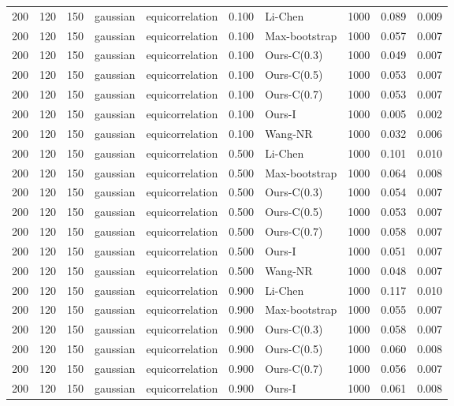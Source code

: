 \begin{tabular}{rrrllrlrrr}
200 & 120 & 150 & gaussian & equicorrelation & 0.100 & Li-Chen & 1000 & 0.089 & 0.009 \\
200 & 120 & 150 & gaussian & equicorrelation & 0.100 & Max-bootstrap & 1000 & 0.057 & 0.007 \\
200 & 120 & 150 & gaussian & equicorrelation & 0.100 & Ours-C(0.3) & 1000 & 0.049 & 0.007 \\
200 & 120 & 150 & gaussian & equicorrelation & 0.100 & Ours-C(0.5) & 1000 & 0.053 & 0.007 \\
200 & 120 & 150 & gaussian & equicorrelation & 0.100 & Ours-C(0.7) & 1000 & 0.053 & 0.007 \\
200 & 120 & 150 & gaussian & equicorrelation & 0.100 & Ours-I & 1000 & 0.005 & 0.002 \\
200 & 120 & 150 & gaussian & equicorrelation & 0.100 & Wang-NR & 1000 & 0.032 & 0.006 \\
200 & 120 & 150 & gaussian & equicorrelation & 0.500 & Li-Chen & 1000 & 0.101 & 0.010 \\
200 & 120 & 150 & gaussian & equicorrelation & 0.500 & Max-bootstrap & 1000 & 0.064 & 0.008 \\
200 & 120 & 150 & gaussian & equicorrelation & 0.500 & Ours-C(0.3) & 1000 & 0.054 & 0.007 \\
200 & 120 & 150 & gaussian & equicorrelation & 0.500 & Ours-C(0.5) & 1000 & 0.053 & 0.007 \\
200 & 120 & 150 & gaussian & equicorrelation & 0.500 & Ours-C(0.7) & 1000 & 0.058 & 0.007 \\
200 & 120 & 150 & gaussian & equicorrelation & 0.500 & Ours-I & 1000 & 0.051 & 0.007 \\
200 & 120 & 150 & gaussian & equicorrelation & 0.500 & Wang-NR & 1000 & 0.048 & 0.007 \\
200 & 120 & 150 & gaussian & equicorrelation & 0.900 & Li-Chen & 1000 & 0.117 & 0.010 \\
200 & 120 & 150 & gaussian & equicorrelation & 0.900 & Max-bootstrap & 1000 & 0.055 & 0.007 \\
200 & 120 & 150 & gaussian & equicorrelation & 0.900 & Ours-C(0.3) & 1000 & 0.058 & 0.007 \\
200 & 120 & 150 & gaussian & equicorrelation & 0.900 & Ours-C(0.5) & 1000 & 0.060 & 0.008 \\
200 & 120 & 150 & gaussian & equicorrelation & 0.900 & Ours-C(0.7) & 1000 & 0.056 & 0.007 \\
200 & 120 & 150 & gaussian & equicorrelation & 0.900 & Ours-I & 1000 & 0.061 & 0.008 \\

\end{tabular}
